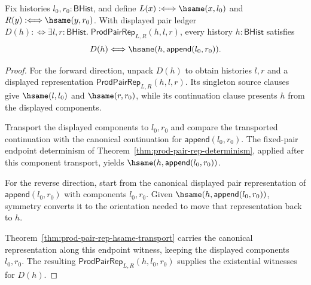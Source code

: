 \begin{theorem}
\label{thm:prod-singleton-displayed-pair-ledger-endpoint-exactness}
Fix histories $l_0,r_0:\mathsf{BHist}$, and define
$L(x):\Longleftrightarrow\hsame(x,l_0)$ and
$R(y):\Longleftrightarrow\hsame(y,r_0)$. With displayed pair ledger
$D(h):\Longleftrightarrow
\exists l,r:\mathsf{BHist}.\;\mathsf{ProdPairRep}_{L,R}(h,l,r)$, every
history $h:\mathsf{BHist}$ satisfies
$$
D(h)\Longleftrightarrow\hsame(h,\mathsf{append}(l_0,r_0)).
$$
\end{theorem}
\begin{proof}
For the forward direction, unpack $D(h)$ to obtain histories $l,r$ and a
displayed representation $\mathsf{ProdPairRep}_{L,R}(h,l,r)$. Its singleton
source clauses give $\hsame(l,l_0)$ and $\hsame(r,r_0)$, while its
continuation clause presents $h$ from the displayed components.

Transport the displayed components to $l_0,r_0$ and compare the transported
continuation with the canonical continuation for
$\mathsf{append}(l_0,r_0)$. The fixed-pair endpoint determinism of
Theorem~\ref{thm:prod-pair-rep-determinism}, applied after this component
transport, yields $\hsame(h,\mathsf{append}(l_0,r_0))$.

For the reverse direction, start from the canonical displayed pair
representation of $\mathsf{append}(l_0,r_0)$ with components $l_0,r_0$. Given
$\hsame(h,\mathsf{append}(l_0,r_0))$, symmetry converts it to the orientation
needed to move that representation back to $h$.

Theorem~\ref{thm:prod-pair-rep-hsame-transport} carries the canonical
representation along this endpoint witness, keeping the displayed components
$l_0,r_0$. The resulting
$\mathsf{ProdPairRep}_{L,R}(h,l_0,r_0)$ supplies the existential witnesses for
$D(h)$.
\end{proof}

